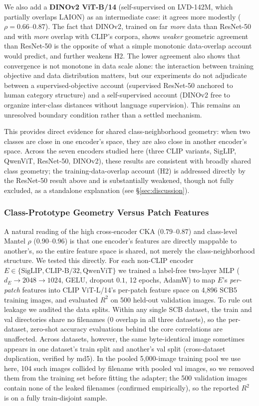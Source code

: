 \documentclass[a4paper,fleqn]{cas-sc}
\begin{document}
We also add a \textbf{DINOv2 ViT-B/14} \cite{oquab2024dinov2} (self-supervised on LVD-142M, which partially overlaps LAION) as an intermediate case: it agrees more modestly ($\rho=0.66$--$0.87$). The fact that DINOv2, trained on far \emph{more} data than ResNet-50 and with \emph{more} overlap with CLIP's corpora, shows \emph{weaker} geometric agreement than ResNet-50 is the opposite of what a simple monotonic data-overlap account would predict, and further weakens H2. The lower agreement also shows that convergence is not monotone in data scale alone: the interaction between training objective and data distribution matters, but our experiments do not adjudicate between a supervised-objective account (supervised ResNet-50 anchored to human category structure) and a self-supervised account (DINOv2 free to organize inter-class distances without language supervision). This remains an unresolved boundary condition rather than a settled mechanism.

This provides direct evidence for shared class-neighborhood geometry: when two classes are close in one encoder's space, they are also close in another encoder's space. Across the seven encoders studied here (three CLIP variants, SigLIP, QwenViT, ResNet-50, DINOv2), these results are consistent with broadly shared class geometry; the training-data-overlap account (H2) is addressed directly by the ResNet-50 result above and is substantially weakened, though not fully excluded, as a standalone explanation (see \S\ref{sec:discussion}).

\subsubsection{Class-Prototype Geometry Versus Patch Features}
\label{sec:patchlevel}

A natural reading of the high cross-encoder CKA ($0.79$--$0.87$) and class-level Mantel $\rho$ ($0.90$--$0.96$) is that one encoder's features are directly mappable to another's, so the entire feature space is shared, not merely the class-neighborhood structure. We tested this directly. For each non-CLIP encoder $E \in \{\text{SigLIP}, \text{CLIP-B/32}, \text{QwenViT}\}$ we trained a label-free two-layer MLP ($d_E \to 2048 \to 1024$, GELU, dropout $0.1$, 12 epochs, AdamW) to map $E$'s \emph{per-patch} features into CLIP ViT-L/14's per-patch feature space on 4{,}896 SCB5 training images, and evaluated $R^2$ on 500 held-out validation images. To rule out leakage we audited the data splits. Within any single SCB dataset, the train and val directories share no filenames (0 overlap in all three datasets), so the per-dataset, zero-shot accuracy evaluations behind the core correlations are unaffected. Across datasets, however, the same byte-identical image sometimes appears in one dataset's train split and another's val split (cross-dataset duplication, verified by md5). In the pooled 5,000-image training pool we use here, 104 such images collided by filename with pooled val images, so we removed them from the training set before fitting the adapter; the 500 validation images contain none of the leaked filenames (confirmed empirically), so the reported $R^2$ is on a fully train-disjoint sample.
\end{document}
